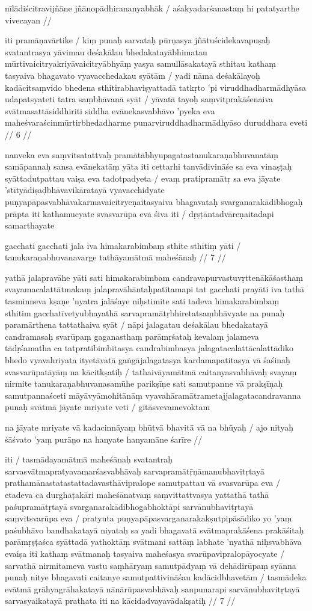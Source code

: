 nīlādiścitravijñāne jñānopādhirananyabhāk  /
aśakyadarśanastaṃ hi patatyarthe vivecayan  //

iti pramāṇavārtike  / kiṃ punaḥ sarvataḥ pūrṇasya jñātuścidekavapuṣaḥ svatantrasya yāvimau deśakālau bhedakatayābhimatau mūrtivaicitryakriyāvaicitryābhyāṃ yasya samullāsakatayā sthitau kathaṃ tasyaiva bhagavato vyavacchedakau syātām  / yadi nāma deśakālayoḥ kadācitsaṃvido bhedena sthitirabhaviṣyattadā tatkṛto 'pi viruddhadharmādhyāsa udapatsyateti tatra saṃbhāvanā syāt  / yāvatā tayoḥ saṃvitprakāśenaiva svātmasattāsiddhiriti siddha evānekasvabhāvo 'pyeka eva maheśvaraścinmūrtirbhedadharme punarviruddhadharmādhyāso duruddhara eveti  // 6  //

nanveka eva saṃvitsatattvaḥ pramātābhyupagatastanukaraṇabhuvanatāṃ samāpannaḥ sansa evānekatāṃ yāta iti cettarhi tanvādivināśe sa eva vinaṣṭaḥ syāttadutpattau vaiṣa eva tadotpadyeta  / evaṃ pratipramātṛ sa eva jāyate 'stītyādiṣaḍbhāvavikāratayā vyavacchidyate puṇyapāpasvabhāvakarmavaicitryeṇaitasyaiva bhagavataḥ svarganarakādibhogaḥ prāpta iti kathamucyate svasvarūpa eva śiva iti  / dṛṣṭāntadvāreṇaitadapi samarthayate

gacchati gacchati jala iva himakarabimbaṃ sthite sthitiṃ yāti  /
tanukaraṇabhuvanavarge tathāyamātmā maheśānaḥ  // 7  //

yathā jalapravāhe yāti sati himakarabimbam candravapurvastuvṛttenākāśasthaṃ svayamacalattātmakaṃ jalapravāhāntaḥpatitamapi tat gacchati prayāti iva tathā tasminneva kṣaṇe 'nyatra jalāśaye niḥstimite sati tadeva himakarabimbaṃ sthitim gacchatīvetyubhayathā sarvapramātṛbhiretatsaṃbhāvyate na punaḥ paramārthena tattathaiva syāt  / nāpi jalagatau deśakālau bhedakatayā candramasaḥ svarūpaṃ gaganasthaṃ parāmṛśataḥ kevalaṃ jalameva tādṛśamatha ca tatpratibimbitasya candrabimbasya jalagatacalattācalattādiko bhedo vyavahriyata ityetāvatā gaṅgājalagatasya kardamapatitasya vā śaśinaḥ svasvarūpatāyāṃ na kācitkṣatiḥ  / tathaivāyamātmā caitanyasvabhāvaḥ svayaṃ nirmite tanukaraṇabhuvanasamūhe parikṣīṇe sati samutpanne vā prakṣīṇaḥ samutpannaśceti māyāvyāmohitānāṃ vyavahāramātrametajjalagatacandravanna punaḥ svātmā jāyate mriyate veti  / gītāsvevamevoktam

na jāyate mriyate vā kadacinnāyaṃ bhūtvā bhavitā vā na bhūyaḥ  /
ajo nityaḥ śāśvato 'yaṃ purāṇo na hanyate hanyamāne śarīre  //

iti  / tasmādayamātmā maheśānaḥ svatantraḥ sarvasvātmapratyavamarśasvabhāvaḥ sarvapramātṝṇāmanubhavitṛtayā prathamānastatastattadavasthāvipralope samutpattau vā svasvarūpa eva  / etadeva ca durghaṭakāri maheśānatvaṃ saṃvittattvasya yattathā tathā paśupramātṛtayā svarganarakādibhogabhoktāpi sarvānubhavitṛtayā saṃvitsvarūpa eva  / pratyuta puṇyapāpasvarganarakakṣutpipāsādiko yo 'yaṃ paśubhāvo bandhakatayā niyataḥ sa yadi bhagavatā svātmaprakāśena prakāśitaḥ parāmṛṣṭaśca syāttadā yathoktāṃ svātmani sattāṃ labhate 'nyathā niḥsvabhāva evaiṣa iti kathaṃ svātmanaḥ tasyaiva maheśasya svarūpavipralopāyocyate  / sarvathā nirmitameva vastu saṃhāryaṃ samutpādyaṃ vā dehādirūpaṃ syānna punaḥ nitye bhagavati caitanye samutpattivināśau kadācidbhavetām  / tasmādeka evātmā grāhyagrāhakatayā nānārūpasvabhāvaḥ sanpunarapi sarvānubhavitṛtayā sarvasyaikatayā prathata iti na kācidadvayavādakṣatiḥ  // 7  //

